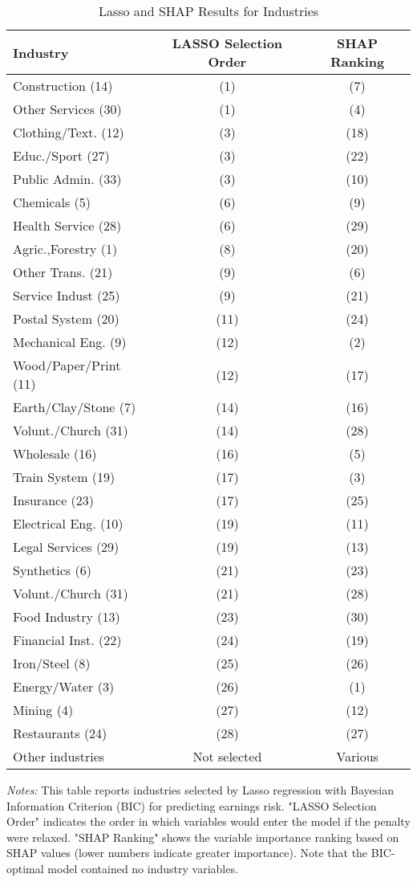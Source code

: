 \documentclass[12pt]{article}
\begin{document}
\begin{table}[H]
\centering
\caption{Lasso and SHAP Results for Industries}

\begin{tabular}{lcc}

\toprule
Industry & LASSO Selection Order & SHAP Ranking \\
\midrule
Construction (14) & (1) & (7) \\
Other Services (30) & (1) & (4) \\
Clothing/Text. (12) & (3) & (18) \\
Educ./Sport (27) & (3) & (22) \\
Public Admin. (33) & (3) & (10) \\
Chemicals (5) & (6) & (9) \\
Health Service (28) & (6) & (29) \\
Agric.,Forestry (1) & (8) & (20) \\
Other Trans. (21) & (9) & (6) \\
Service Indust (25) & (9) & (21) \\
Postal System (20) & (11) & (24) \\
Mechanical Eng. (9) & (12) & (2) \\
Wood/Paper/Print (11) & (12) & (17) \\
Earth/Clay/Stone (7) & (14) & (16) \\
Volunt./Church (31) & (14) & (28) \\
Wholesale (16) & (16) & (5) \\
Train System (19) & (17) & (3) \\
Insurance (23) & (17) & (25) \\
Electrical Eng. (10) & (19) & (11) \\
Legal Services (29) & (19) & (13) \\
Synthetics (6) & (21) & (23) \\
Volunt./Church (31) & (21) & (28) \\
Food Industry (13) & (23) & (30) \\
Financial Inst. (22) & (24) & (19) \\
Iron/Steel (8) & (25) & (26) \\
Energy/Water (3) & (26) & (1) \\
Mining (4) & (27) & (12) \\
Restaurants (24) & (28) & (27) \\
Other industries & Not selected & Various \\
\bottomrule
\end{tabular}%
\newline

\footnotesize
\textit{Notes:} This table reports industries selected by Lasso regression with Bayesian Information Criterion (BIC) for predicting earnings risk. "LASSO Selection Order" indicates the order in which variables would enter the model if the penalty were relaxed. "SHAP Ranking" shows the variable importance ranking based on SHAP values (lower numbers indicate greater importance). Note that the BIC-optimal model contained no industry variables.

\end{table}
\end{document}

